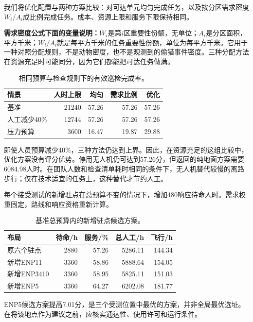\documentclass[12pt,a4paper]{article}
\numberwithin{equation}{section}
\begin{document}
我们将优化配置与两种方案比较：对可达单元均匀完成任务，以及按分区需求密度$W_i/A_i$成比例完成任务。成本、资源上限和服务下限保持相同。

\noindent\textbf{需求密度公式下面的变量说明：}$W_i$是第$i$区重要性份额，无单位；$A_i$是分区面积，平方千米；$W_i/A_i$就是每平方千米的任务重要性份额，单位为每平方千米。它用于一种对照分配规则，不是动物密度，也不是观测到的偷猎事件密度。三种分配方法在资源充足时可能同分，因为它们都能把可达任务做满。


\begin{table}[H]
\centering\normalsize
\caption{相同预算与检查规则下的有效巡检完成率。}
\label{tab:comparison}
\begin{tabular}{lrrrr}
\toprule
情景 & 人时上限 & 均匀 & 需求比例 & 优化 \\
\midrule
基准 & 21240 & 57.26 & 57.26 & 57.26 \\
人工减少40\% & 12744 & 57.26 & 57.26 & 57.26 \\
压力预算 & 3600 & 16.47 & 19.87 & 29.88 \\
\bottomrule
\end{tabular}
\end{table}

即使人员预算减少40\%，三种方法仍达到上界。因此，在资源充足的这组比较中，优化方案没有评分优势。停用无人机仍可达到57.26分，但返回的纯地面方案需要6084.98人时。在团队人数和检查清单耗时相同的条件下，无人机替代较慢的离路步行；仅在技术适宜的任务上，这种替代才节约人工。

每个接受测试的新增驻点在总预算不变的情况下，增加480响应待命人时。需求权重固定，路线和响应资格重新计算。

\begin{table}[H]
\centering\normalsize
\caption{基准总预算内的新增驻点候选方案。}
\label{tab:forward}
\begin{tabular}{lrrrr}
\toprule
布局 & 待命/h & 服务/\% & 总人工/h & 飞行/h \\
\midrule
原六个驻点 & 2880 & 57.26 & 5286.11 & 144.34 \\
新增ENP11 & 3360 & 58.86 & 5888.64 & 154.05 \\
新增ENP3410 & 3360 & 58.95 & 5825.11 & 151.03 \\
新增ENP5 & 3360 & 64.27 & 6202.08 & 181.77 \\
\bottomrule
\end{tabular}
\end{table}

ENP5候选方案提高7.01分，是三个受测位置中最优的方案，并非全局最优选址。在将该地点作为建议之前，应核实通达性、使用许可和运行条件。
\clearpage
\end{document}
